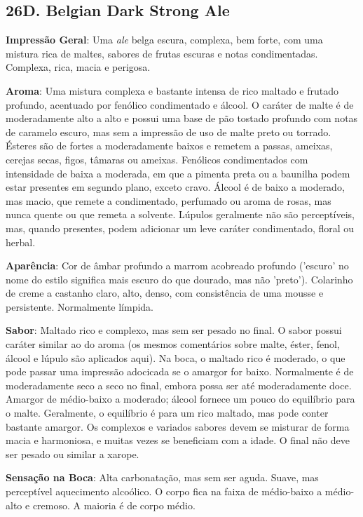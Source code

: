 \subsection*{26D. Belgian Dark Strong Ale}
\textbf{Impressão Geral}: Uma \textit{ale} belga escura, complexa, bem forte, com uma mistura rica de maltes, sabores de frutas escuras e notas condimentadas. Complexa, rica, macia e perigosa.

\textbf{Aroma}: Uma mistura complexa e bastante intensa de rico maltado e frutado profundo, acentuado por fenólico condimentado e álcool. O caráter de malte é de moderadamente alto a alto e possui uma base de pão tostado profundo com notas de caramelo escuro, mas sem a impressão de uso de malte preto ou torrado. Ésteres são de fortes a moderadamente baixos e remetem a passas, ameixas, cerejas secas, figos, tâmaras ou ameixas. Fenólicos condimentados com intensidade de baixa a moderada, em que a pimenta preta ou a baunilha podem estar presentes em segundo plano, exceto cravo. Álcool é de baixo a moderado, mas macio, que remete a condimentado, perfumado ou aroma de rosas, mas nunca quente ou que remeta a solvente. Lúpulos geralmente não são perceptíveis, mas, quando presentes, podem adicionar um leve caráter condimentado, floral ou herbal.

\textbf{Aparência}: Cor de âmbar profundo a marrom acobreado profundo ('escuro' no nome do estilo significa mais escuro do que dourado, mas não 'preto'). Colarinho de creme a castanho claro, alto, denso, com consistência de uma mousse e persistente. Normalmente límpida.

\textbf{Sabor}: Maltado rico e complexo, mas sem ser pesado no final. O sabor possui caráter similar ao do aroma (os mesmos comentários sobre malte, éster, fenol, álcool e lúpulo são aplicados aqui). Na boca, o maltado rico é moderado, o que pode passar uma impressão adocicada se o amargor for baixo. Normalmente é de moderadamente seco a seco no final, embora possa ser até moderadamente doce. Amargor de médio-baixo a moderado; álcool fornece um pouco do equilíbrio para o malte. Geralmente, o equilíbrio é para um rico maltado, mas pode conter bastante amargor. Os complexos e variados sabores devem se misturar de forma macia e harmoniosa, e muitas vezes se beneficiam com a idade. O final não deve ser pesado ou similar a xarope.

\textbf{Sensação na Boca}: Alta carbonatação, mas sem ser aguda. Suave, mas perceptível aquecimento alcoólico. O corpo fica na faixa de médio-baixo a médio-alto e cremoso. A maioria é de corpo médio.

